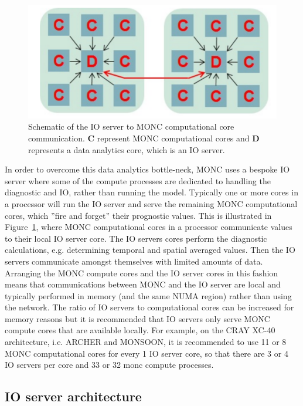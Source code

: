 \documentclass[a4paper,11pt]{article}
\begin{document}
\begin{figure}
  \centering
\includegraphics[scale=0.25]{MONC_to_IOserver_fig.png}
\caption{Schematic of the IO server to MONC computational core communication.
{\bf{C}} represent MONC computational cores and {\bf{D}} represents a data analytics
core, which is an IO server.}
\label{fig:ioserver}
\end{figure}

In order to overcome this data analytics bottle-neck, MONC uses a bespoke IO
server where some of the compute processes are dedicated
to handling the diagnostic and IO, rather than running the model. Typically one
or more cores in a processor will run the IO server and serve the remaining MONC
computational cores, which ''fire and forget'' their prognostic values.
This is illustrated in Figure~\ref{fig:ioserver}, where MONC computational
cores in a processor communicate values to their local IO server core. The IO
servers cores perform the diagnostic calculations, e.g. determining temporal and
spatial averaged values. Then the IO servers communicate amongst themselves with
limited amounts of data. Arranging the MONC compute cores and the IO server cores
in this fashion means that communications between MONC and the IO server are
local and typically performed in memory (and the same NUMA region) rather than
using the network. The ratio of IO servers to computational cores can be increased
for memory reasons but it is recommended that IO servers only serve MONC compute cores
that are available locally. For example, on the CRAY XC-40 architecture, i.e.
ARCHER and MONSOON, it is recommended  to use 11 or 8 MONC computational cores
for every 1 IO server core, so that there are 3 or 4 IO servers per core and
33 or 32 monc compute processes.

\subsection{IO server architecture}
\end{document}
